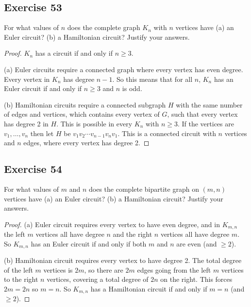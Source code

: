 \documentclass[14pt]{extarticle}
\begin{document}
\subsection{Exercise 53}
For what values of \(n\) does the complete graph \(K_n\) with \(n\) vertices have (a) an Euler circuit? (b) a Hamiltonian
circuit? Justify your answers.

\begin{proof}
    \(K_n\) has a circuit if and only if \(n \geq 3\).

    (a) Euler circuits require a connected graph where every vertex has even degree. Every vertex in \(K_n\) has degree
    \(n-1\). So this means that for all \(n\), \(K_n\) has an Euler circuit if and only if \(n \geq 3\) and \(n\) is odd.

    (b) Hamiltonian circuits require a connected subgraph \(H\) with the same number of edges and vertices, which contains
    every vertex of \(G\), such that every vertex has degree 2 in \(H\). This is possible in every \(K_n\) with \(n \geq 3\). If
    the vertices are \(v_1, \ldots, v_n\) then let \(H\) be \(v_1v_2\cdots v_{n-1}v_nv_1\). This is a connected circuit
    with \(n\) vertices and \(n\) edges, where every vertex has degree 2.
\end{proof}

\subsection{Exercise 54}
For what values of \(m\) and \(n\) does the complete bipartite graph on \((m, n)\) vertices have (a) an Euler circuit? (b) a
Hamiltonian circuit? Justify your answers.

\begin{proof}
    (a) Euler circuit requires every vertex to have even degree, and in \(K_{m,n}\) the left \(m\) vertices all have degree
    \(n\) and the right \(n\) vertices all have degree \(m\). So \(K_{m,n}\) has an Euler circuit if and only if both \(m\) and
    \(n\) are even (and \(\geq 2\)).

    (b) Hamiltonian circuit requires every vertex to have degree 2. The total degree of the left \(m\) vertices is \(2m\), so
    there are \(2m\) edges going from the left \(m\) vertices to the right \(n\) vertices, covering a total degree of \(2n\) on
    the right. This forces \(2m = 2n\) so \(m=n\). So \(K_{m,n}\) has a Hamiltonian circuit if and only if \(m=n\) (and \(\geq 2\)).
\end{proof}
\end{document}
